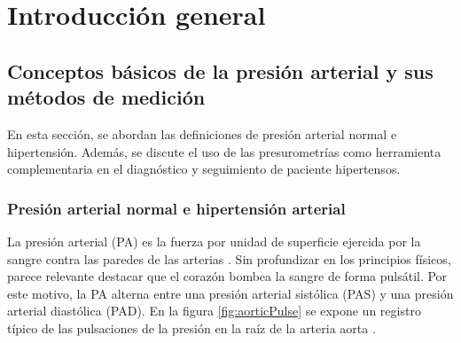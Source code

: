 
\chapter{Introducción general} %

\label{Chapter1} %
\label{IntroGeneral}


\newcommand{\keyword}[1]{\textbf{#1}}
\newcommand{\tabhead}[1]{\textbf{#1}}
\newcommand{\code}[1]{\texttt{#1}}
\newcommand{\file}[1]{\texttt{\bfseries#1}}
\newcommand{\option}[1]{\texttt{\itshape#1}}
\newcommand{\grados}{$^{\circ}$}



\section{Conceptos básicos de la presión arterial y sus métodos de medición}

En esta sección, se abordan las definiciones de presión arterial normal e hipertensión. 
Además, se discute el uso de las presurometrías como herramienta complementaria en el diagnóstico 
y seguimiento de paciente hipertensos.

\subsection{Presión arterial normal e hipertensión arterial}

La presión arterial (PA) es la fuerza por unidad de superficie ejercida por la sangre contra las paredes 
de las arterias \citep{CITE:1}. Sin profundizar en los principios físicos, parece relevante destacar que el corazón 
bombea la sangre de forma pulsátil. Por este motivo, la PA alterna entre una presión arterial sistólica (PAS) 
y una presión arterial diastólica (PAD). En la figura \ref{fig:aorticPulse} se expone un registro típico de las pulsaciones 
de la presión en la raíz de la arteria aorta \citep{CITE:2} \citep{CITE:3}. 

